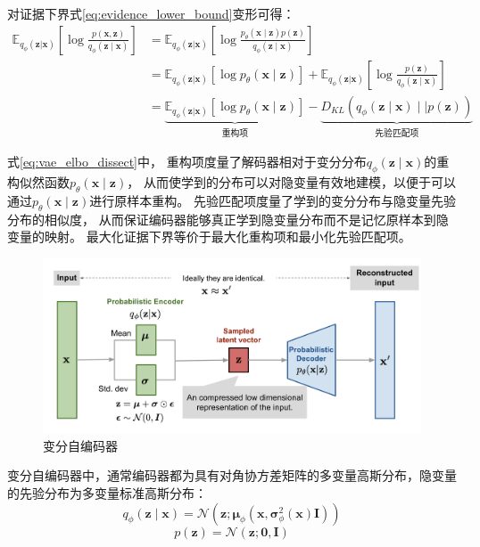 对证据下界式{\ref{eq:evidence_lower_bound}}变形可得：
\begin{align}
    \mathbb{E}_{q_{\phi}(\bm{z}|\bm{x})}\left[\log\frac{p(\bm{x},\bm{z})}{q_{\phi}(\bm{z}\mid\bm{x})}\right]
    &=\mathbb{E}_{q_{\phi}(\bm{z}|\bm{x})}\left[\log\frac{p_{\theta}(\bm{x}\mid \bm{z})p(\bm{z})}{q_{\phi}(\bm{z}\mid\bm{x})}\right] \\
    &=\mathbb{E}_{q_{\phi}(\bm{z}|\bm{x})}\left[\log p_{\theta}(\bm{x}\mid \bm{z})\right] + \mathbb{E}_{q_{\phi}(\bm{z}|\bm{x})}\left[\log\frac{p(\bm{z})}{q_{\phi}(\bm{z}\mid\bm{x})}\right]\\
    &=\underbrace{\mathbb{E}_{q_{\phi}(\bm{z}|\bm{x})}\left[\log p_{\theta}(\bm{x}\mid \bm{z})\right] }_{\mbox{重构项}} -\underbrace{ D_{KL}(q_{\phi}(\bm{z}\mid \bm{x}) \mid \mid p(\bm{z}))}_{\mbox{先验匹配项}}  \label{eq:vae_elbo_dissect}
\end{align}

式{\ref{eq:vae_elbo_dissect}}中，
重构项度量了解码器相对于变分分布{$q_{\phi}(\bm{z}\mid \bm{x})$}的重构似然函数{$p_{\theta}(\bm{x}\mid \bm{z})$}，
从而使学到的分布可以对隐变量有效地建模，以便于可以通过{$p_{\theta}(\bm{x}\mid\bm{z})$}进行原样本重构。
先验匹配项度量了学到的变分分布与隐变量先验分布的相似度，
从而保证编码器能够真正学到隐变量分布而不是记忆原样本到隐变量的映射。
最大化证据下界等价于最大化重构项和最小化先验匹配项。
\begin{figure}[ht]
    \centering
    \includegraphics[height=0.4\textwidth]{figures/vae}
    \caption{变分自编码器}\label{fig:vae}
\end{figure}


变分自编码器中，通常编码器都为具有对角协方差矩阵的多变量高斯分布，隐变量的先验分布为多变量标准高斯分布：
\begin{equation}
    \label{eq:vae_q_phi_z_mid_x_gaussian}
    q_{\phi}(\bm{z}\mid\bm{x})=\mathcal{N}(\bm{z};\bm{\mu}_{\phi}(\bm{x},\bm{\sigma}_{\phi}^{2}(\bm{x})\bm{I}))
\end{equation}
\begin{equation}
    \label{eq:vae_p_z_gaussian}
    p(\bm{z})=\mathcal{N}(\bm{z};\bm{0},\bm{I})
\end{equation}

